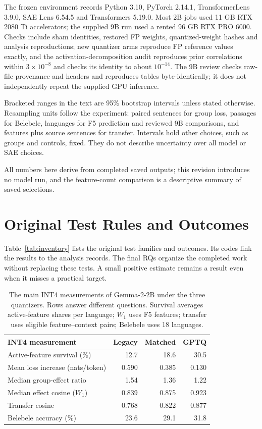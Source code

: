 \documentclass[11pt]{article}
\begin{document}
The frozen environment records Python 3.10, PyTorch 2.14.1, TransformerLens 3.9.0, SAE Lens 6.54.5 and Transformers 5.19.0. Most 2B jobs used 11 GB RTX 2080 Ti accelerators; the supplied 9B run used a rented 96 GB RTX PRO 6000. Checks include sham identities, restored FP weights, quantized-weight hashes and analysis reproductions; new quantizer arms reproduce FP reference values exactly, and the activation-decomposition audit reproduces prior correlations within $3\times10^{-8}$ and checks its identity to about $10^{-14}$. The 9B review checks raw-file provenance and headers and reproduces tables byte-identically; it does not independently repeat the supplied GPU inference. 

Bracketed ranges in the text are 95\% bootstrap intervals unless stated otherwise. Resampling units follow the experiment: paired sentences for group loss, passages for Belebele, languages for F5 prediction and reviewed 9B comparisons, and features plus source sentences for transfer. Intervals hold other choices, such as groups and controls, fixed. They do not describe uncertainty over all model or SAE choices.

All numbers here derive from completed saved outputs; this revision introduces no model run, and the feature-count comparison is a descriptive summary of saved selections.

\section{Original Test Rules and Outcomes}
Table~\ref{tab:inventory} lists the original test families and outcomes. Its codes link the results to the analysis records. The final RQs organize the completed work without replacing these tests. A small positive estimate remains a result even when it misses a practical target.
\begin{table}[t]
\centering
\small
\begin{tabular}{p{3.0cm}rrr}
\toprule
INT4 measurement & Legacy & Matched & GPTQ\\
\midrule
Active-feature survival (\%) & 12.7 & 18.6 & 30.5\\
Mean loss increase (nats/token) & 0.590 & 0.385 & 0.130\\
Median group-effect ratio & 1.54 & 1.36 & 1.22\\
Median effect cosine ($W_1$) & 0.839 & 0.875 & 0.923\\
Transfer cosine & 0.768 & 0.822 & 0.877\\
Belebele accuracy (\%) & 23.6 & 29.1 & 31.8\\
\bottomrule
\end{tabular}
\caption{The main INT4 measurements of Gemma-2-2B under the three quantizers. Rows answer different questions. Survival averages active-feature shares per language; $W_1$ uses F5 features; transfer uses eligible feature--context pairs; Belebele uses 18 languages.}
\label{tab:quantizers}
\end{table}
\end{document}
